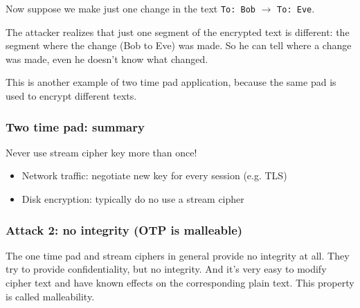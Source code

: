 \documentclass[12pt]{book}
\begin{document}
Now suppose we make just one change in the text \verb|To: Bob| $\rightarrow$ \verb|To: Eve|.
\begin{center}
\end{center}
The attacker realizes that just one segment of the encrypted text is different: the segment where the change (Bob to Eve) was made. So he can tell where a change was made, even he doesn't know what changed.

This is another example of two time pad application, because the same pad is used to encrypt different texts.

\subsubsection{Two time pad: summary}
Never use stream cipher key more than once!
\begin{itemize}
	\item Network traffic: negotiate new key for every session (e.g. TLS)
	\item Disk encryption: typically do no use a stream cipher
\end{itemize}

\subsubsection{Attack 2: no integrity (OTP is malleable)}
The one time pad and stream ciphers in general provide no integrity at all. They try to provide confidentiality, but no integrity. And it's very easy to modify cipher text and have known effects on the corresponding plain text. This property is called malleability.
\end{document}
